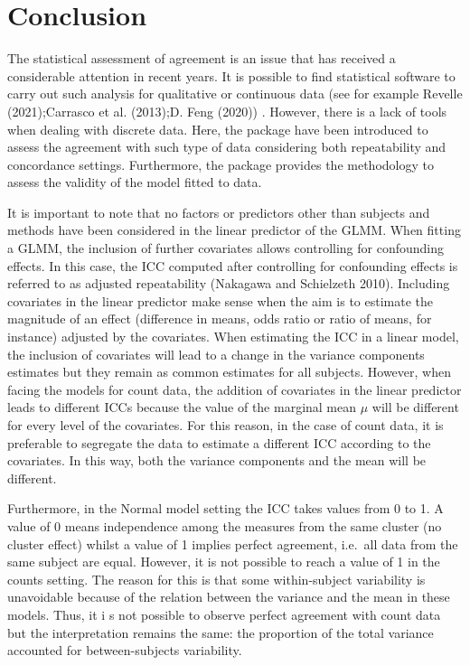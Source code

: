 \hypertarget{conclusion}{%
\section{Conclusion}\label{conclusion}}

The statistical assessment of agreement is an issue that has received a considerable attention in recent years. It is possible to find statistical software to carry out such analysis for qualitative or continuous data (see for example Revelle (2021);Carrasco et al. (2013);D. Feng (2020))
. However, there is a lack of tools when dealing with discrete data. Here, the  package have been introduced to assess the agreement with such type of data considering both repeatability and concordance settings. Furthermore, the  package provides the methodology to assess the validity of the model fitted to data.

It is important to note that no factors or predictors other than subjects and methods have been considered in the linear predictor of the GLMM. When fitting a GLMM, the inclusion of further covariates allows controlling for confounding effects. In this case, the ICC computed after controlling for confounding effects is referred to as adjusted repeatability (Nakagawa and Schielzeth 2010). Including covariates in the linear predictor make sense when the aim is to estimate the magnitude of an effect (difference in means, odds ratio or ratio of means, for instance) adjusted by the covariates. When estimating the ICC in a linear model, the inclusion of covariates will lead to a change in the variance components estimates but they remain as common estimates for all subjects. However, when facing the models for count data, the addition of covariates in the linear predictor leads to different ICCs because the value of the marginal mean \(\mu\) will be different for every level of the covariates. For this reason, in the case of count data, it is preferable to segregate the data to estimate a different ICC according to the covariates. In this way, both the variance components and the mean will be different.

Furthermore, in the Normal model setting the ICC takes values from 0 to 1. A value of 0 means independence among the measures from the same cluster (no cluster effect) whilst a value of 1 implies perfect agreement, i.e.~all data from the same subject are equal. However, it is not possible to reach a value of 1 in the counts setting. The reason for this is that some within-subject variability is unavoidable because of the relation between the variance and the mean in these models. Thus, it i s not possible to observe perfect agreement with count data but the interpretation remains the same: the proportion of the total variance accounted for between-subjects variability.

